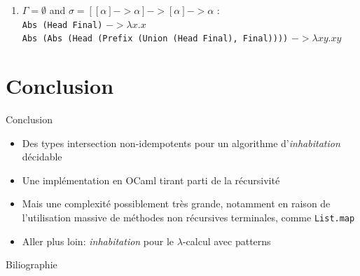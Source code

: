 \documentclass{beamer}
\begin{document}
\begin{frame}
\begin{enumerate}
       \item $\Gamma = \emptyset$ and $\sigma = [[\alpha] -> \alpha] -> [\alpha] -> \alpha$ : \\
           \qquad \texttt{Abs (Head Final)} $->\lambda x.x$\\
           \qquad \texttt{Abs (Abs (Head (Prefix (Union (Head Final), Final))))} $->\lambda xy.xy$    
   \end{enumerate}
    \end{frame}
    
    \section{Conclusion}
    \begin{frame}{Conclusion}
    \begin{itemize}
        \item Des types intersection non-idempotents pour un algorithme d'\emph{inhabitation} décidable
        \item Une implémentation en OCaml tirant parti de la récursivité
        \item Mais une complexité possiblement très grande, notamment en raison de l'utilisation massive de méthodes non récursives terminales, comme \texttt{List.map}
        \item Aller plus loin: \emph{inhabitation} pour le $\lambda$-calcul avec patterns
    \end{itemize}
    \end{frame}
    
    \begin{frame}{Biliographie}
    
    
    \end{frame}
    
\end{document}
